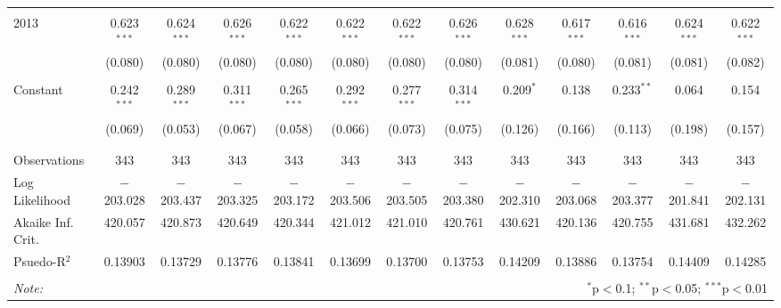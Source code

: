 \begin{table}[H]
\begin{adjustbox}{width=\textwidth}
\begin{tabular}{@{\extracolsep{5pt}}lcccccccccccc}
  & & & & & & & & & & & & \\ 
 2013 & 0.623$^{***}$ & 0.624$^{***}$ & 0.626$^{***}$ & 0.622$^{***}$ & 0.622$^{***}$ & 0.622$^{***}$ & 0.626$^{***}$ & 0.628$^{***}$ & 0.617$^{***}$ & 0.616$^{***}$ & 0.624$^{***}$ & 0.622$^{***}$ \\ 
  & (0.080) & (0.080) & (0.080) & (0.080) & (0.080) & (0.080) & (0.080) & (0.081) & (0.080) & (0.081) & (0.081) & (0.082) \\ 
  & & & & & & & & & & & & \\ 
 Constant & 0.242$^{***}$ & 0.289$^{***}$ & 0.311$^{***}$ & 0.265$^{***}$ & 0.292$^{***}$ & 0.277$^{***}$ & 0.314$^{***}$ & 0.209$^{*}$ & 0.138 & 0.233$^{**}$ & 0.064 & 0.154 \\ 
  & (0.069) & (0.053) & (0.067) & (0.058) & (0.066) & (0.073) & (0.075) & (0.126) & (0.166) & (0.113) & (0.198) & (0.157) \\ 
  & & & & & & & & & & & & \\ 
\hline \\[-1.8ex] 
Observations & 343 & 343 & 343 & 343 & 343 & 343 & 343 & 343 & 343 & 343 & 343 & 343 \\ 
Log Likelihood & $-$203.028 & $-$203.437 & $-$203.325 & $-$203.172 & $-$203.506 & $-$203.505 & $-$203.380 & $-$202.310 & $-$203.068 & $-$203.377 & $-$201.841 & $-$202.131 \\ 
Akaike Inf. Crit. & 420.057 & 420.873 & 420.649 & 420.344 & 421.012 & 421.010 & 420.761 & 430.621 & 420.136 & 420.755 & 431.681 & 432.262 \\ 
Psuedo-R$^{2}$ & 0.13903 & 0.13729 & 0.13776 & 0.13841 & 0.13699 & 0.13700 & 0.13753 & 0.14209 & 0.13886 & 0.13754 & 0.14409 & 0.14285 \\
\hline 
\hline \\[-1.8ex] 
\textit{Note:}  & \multicolumn{12}{r}{$^{*}$p$<$0.1; $^{**}$p$<$0.05; $^{***}$p$<$0.01} \\ 
\end{tabular} 
\end{adjustbox}
\end{table} 
  
  
  
  
  
  
  
